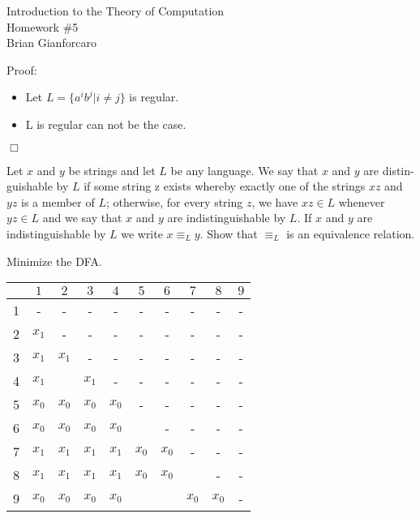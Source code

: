 \documentclass[11pt]{article}
\newcommand{\question}[2] {\vspace{.25in} \fbox{#1} #2 \vspace{.10in}}
\begin{document}
\medskip                        %


\begin{center}                  %
  {\Large Introduction to the Theory of Computation \\ Homework \#5} \\
  Brian Gianforcaro \\
  \date \\
\end{center}

\ttfamily


\question{1}{Proof:}
\begin{center}
  \begin{itemize}
    \item Let $L = \{ a^{i} b^{j} | i \ne j \} $ is regular.

    \item L is regular can not be the case.
  \end{itemize}
\end{center}

\indent $\Box$




\question{2}{
Let $x$ and $y$ be strings and let $L$ be any language. We say that $x$ and $y$ are distin- 
guishable by $L$ if some string z exists whereby exactly one of the strings $xz$ and $yz$ 
is a member of $L$; otherwise, for every string $z$, we have $xz \in L$ whenever $yz \in L$ 
and we say that $x$ and $y$ are indistinguishable by $L$. If $x$ and $y$ are indistinguishable 
by $L$ we write $x {\equiv}_{L} y$. Show that ${\equiv}_{L}$ is an equivalence relation.
  }

\question{3}{}

\question{4}{Minimize the DFA.}
 
\begin{center}
\begin{tabular}{|c|c|c|c|c|c|c|c|c|c|}
\hline
$\;$&$1$&$2$&$3$&$4$&$5$&$6$&$7$&$8$&$9$\\
\hline
1&-&-&-&-&-&-&-&-&-\\
\hline
2&$x_1$&-&-&-&-&-&-&-&-\\
\hline
3&$x_1$&$x_1$&-&-&-&-&-&-&-\\
\hline
4&$x_1$&\;&$x_1$&-&-&-&-&-&-\\
\hline
5&$x_0$&$x_0$&$x_0$&$x_0$&-&-&-&-&-\\
\hline
6&$x_0$&$x_0$&$x_0$&$x_0$&\;&-&-&-&-\\
\hline
7&$x_1$&$x_1$&$x_1$&$x_1$&$x_0$&$x_0$&-&-&-\\
\hline
8&$x_1$&$x_1$&$x_1$&$x_1$&$x_0$&$x_0$&\;&-&-\\
\hline
9&$x_0$&$x_0$&$x_0$&$x_0$&\;&\;&$x_0$&$x_0$&-\\
\hline
\end{tabular}
\end{center}
\end{document}
